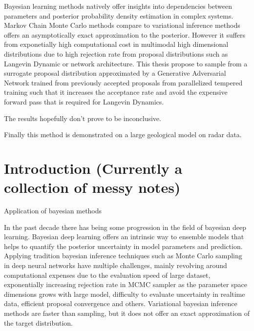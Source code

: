 \documentclass[honours,12pt]{unswthesis}
\newcommand\blankpage{%
    \null
    \thispagestyle{empty}%
    \addtocounter{page}{-1}%
    \newpage}
\numberwithin{equation}{section}
\begin{document}
Bayesian learning methods natively offer insights into dependencies between parameters and posterior probability density estimation in complex systems. Markov Chain Monte Carlo methods compare to variational inference methods offers an asymptotically exact approximation to the posterior. However it suffers from exponetially high computational cost in multimodal high dimensional distributions due to high rejection rate from proposal distributions such as Langevin Dynamic or network architecture. This thesis propose to sample from a surrogate proposal distribution approximated by a Generative Adversarial Network trained from previously accepted proposals from parallelized tempered training such that it increases the acceptance rate and avoid the expensive forward pass that is required for Langevin Dynamics. 

The results hopefully don't prove to be inconclusive.

Finally this method is demonstrated on a large geological model on radar data. 


\afterpage{\blankpage}


\afterpreface

%
%

\afterpage{\blankpage}

\chapter{Introduction (Currently a collection of messy notes)}\label{intro}

Application of bayesian methods

In the past decade there has being some progression in the field of bayesian deep learning. Bayesian deep learning offers an intrinsic way to ensemble models that helps to quantify the posterior uncertainty in model parameters and prediction. Applying tradition bayesian inference techniques such as Monte Carlo sampling in deep neural networks have multiple challenges, mainly revolving around computational expenses due to the evaluation speed of large dataset, exponentially increasing rejection rate in MCMC sampler as the parameter space dimensions grows with large model, difficulty to evaluate uncertainty in realtime data, efficient proposal convergence and others. Variational bayesian inference methods are faster than sampling, but it does not offer an exact approximation of the target distribution. 
\end{document}
